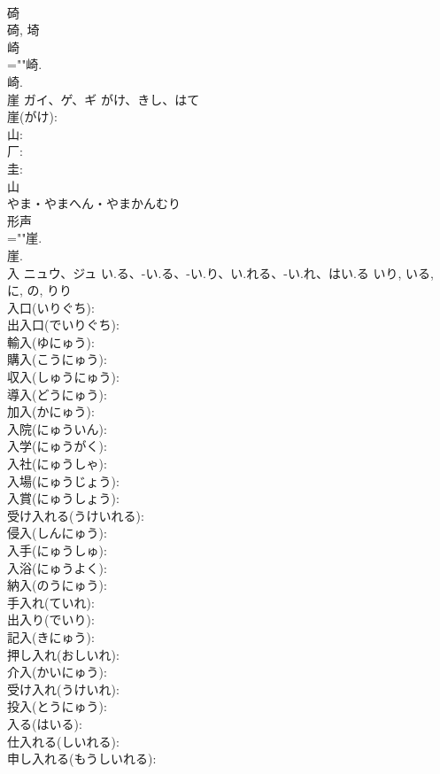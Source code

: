\documentclass[8pt]{extreport}
\begin{document}
\begin{CJK}{UTF8}{min}
\\	碕 
\\	碕, 埼 
\\	崎 
\\	=""崎.
\\	崎.
\\	崖	ガイ、ゲ、ギ	がけ、きし、はて		
\\	崖(がけ): 
\\	山: 
\\	厂: 
\\	圭: 
\\	山	
\\	やま・やまへん・やまかんむり	
\\	形声 
\\	=""崖.
\\	崖.
\\	入	ニュウ、ジュ	い.る、-い.る、-い.り、い.れる、-い.れ、はい.る	いり, いる, に, の, りり	
\\	入口(いりぐち): 
\\	出入口(でいりぐち): 
\\	輸入(ゆにゅう): 
\\	購入(こうにゅう): 
\\	収入(しゅうにゅう): 
\\	導入(どうにゅう): 
\\	加入(かにゅう): 
\\	入院(にゅういん): 
\\	入学(にゅうがく): 
\\	入社(にゅうしゃ): 
\\	入場(にゅうじょう): 
\\	入賞(にゅうしょう): 
\\	受け入れる(うけいれる): 
\\	侵入(しんにゅう): 
\\	入手(にゅうしゅ): 
\\	入浴(にゅうよく): 
\\	納入(のうにゅう): 
\\	手入れ(ていれ): 
\\	出入り(でいり): 
\\	記入(きにゅう): 
\\	押し入れ(おしいれ): 
\\	介入(かいにゅう): 
\\	受け入れ(うけいれ): 
\\	投入(とうにゅう): 
\\	入る(はいる): 
\\	仕入れる(しいれる): 
\\	申し入れる(もうしいれる): 

\end{CJK}
\end{document}
